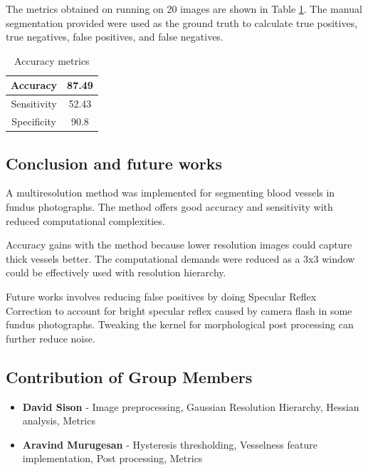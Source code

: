 \documentclass[conference]{IEEEtran}
\begin{document}
The metrics obtained on running on 20 images are shown in Table \ref{table:3}. The manual segmentation provided were used as the ground truth to calculate true positives, true negatives, false positives, and false negatives.

\begin{table}[H]
\centering
 \begin{tabular}{|c| c|} 
 \hline
 Accuracy & 87.49\\ [0.5ex] 
 \hline
 Sensitivity & 52.43 \\ 
 \hline
 Specificity & 90.8\\
 \hline
\end{tabular}
\vspace*{0.25cm}
\caption{Accuracy metrics}
\label{table:3}
\end{table}

\subsection{Conclusion and future works}
\par

A multiresolution method was implemented for segmenting blood vessels in fundus photographs. The method offers good accuracy and sensitivity with reduced computational complexities.
\par
Accuracy gains with the method because lower resolution images could capture thick vessels better. The computational demands were reduced as a 3x3 window could be effectively used with resolution hierarchy.
\par
Future works involves reducing false positives by doing Specular Reflex Correction to account for bright specular reflex caused by camera flash in some fundus photographs. Tweaking the kernel for morphological post processing can further reduce noise.

\subsection{Contribution of Group Members}
\par

\begin{itemize}
		\item \textbf{David Sison}  - Image preprocessing, Gaussian Resolution Hierarchy, Hessian analysis, Metrics
		\item \textbf{Aravind Murugesan}  - Hysteresis thresholding, Vesselness feature implementation, Post processing, Metrics
\end{itemize} 





\end{document}
